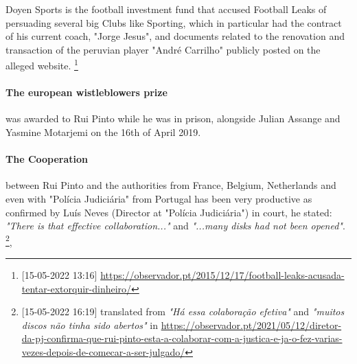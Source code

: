 Doyen Sports is the football investment fund that accused Football Leaks of persuading several big Clubs like Sporting, which in particular had the contract of his current coach, "Jorge Jesus", and documents related to the renovation and transaction of the peruvian player "André Carrilho" publicly posted on the alleged website.
\footnote{[15-05-2022 13:16] \url{https://observador.pt/2015/12/17/football-leaks-acusada-tentar-extorquir-dinheiro/}}

\paragraph{The european wistleblowers prize} was awarded to Rui Pinto while he was in prison, alongside Julian Assange and Yasmine Motarjemi on the 16th of April 2019.

\paragraph{The Cooperation} between Rui Pinto and the authorities from France, Belgium, Netherlands and even with "Polícia Judiciária" from Portugal has been very productive as confirmed by Luís Neves (Director at "Polícia Judiciária") in court, he stated: \textit{"There is that effective collaboration..."} and \textit{"...many disks had not been opened"}.
\footnote{ [15-05-2022 16:19] translated from \textit{"Há essa colaboração efetiva"} and \textit{"muitos discos não tinha sido abertos"} in \url{https://observador.pt/2021/05/12/diretor-da-pj-confirma-que-rui-pinto-esta-a-colaborar-com-a-justica-e-ja-o-fez-varias-vezes-depois-de-comecar-a-ser-julgado/} },  



